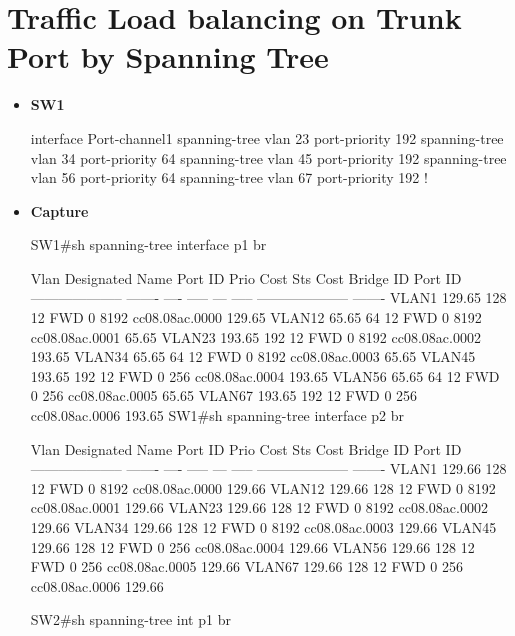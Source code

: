 \documentclass[10pt]{article}
\begin{document}
\section{Traffic Load balancing on Trunk Port by Spanning Tree}
\begin{itemize}
	\item {\bf SW1}
	\begin{verbatim*}
		interface Port-channel1
		 spanning-tree vlan 23 port-priority 192
		 spanning-tree vlan 34 port-priority 64
		 spanning-tree vlan 45 port-priority 192
		 spanning-tree vlan 56 port-priority 64
		 spanning-tree vlan 67 port-priority 192
		!
	\end{verbatim*}
	\item {\bf Capture}
	\begin{verbatim*}
		SW1#sh spanning-tree interface p1 br

		Vlan                                        Designated
		Name                 Port ID Prio Cost  Sts Cost  Bridge ID            Port ID
		-------------------- ------- ---- ----- --- ----- -------------------- -------
		VLAN1                129.65   128    12 FWD     0  8192 cc08.08ac.0000 129.65
		VLAN12                65.65    64    12 FWD     0  8192 cc08.08ac.0001  65.65
		VLAN23               193.65   192    12 FWD     0  8192 cc08.08ac.0002 193.65
		VLAN34                65.65    64    12 FWD     0  8192 cc08.08ac.0003  65.65
		VLAN45               193.65   192    12 FWD     0   256 cc08.08ac.0004 193.65
		VLAN56                65.65    64    12 FWD     0   256 cc08.08ac.0005  65.65
		VLAN67               193.65   192    12 FWD     0   256 cc08.08ac.0006 193.65
		SW1#sh spanning-tree interface p2 br

		Vlan                                        Designated
		Name                 Port ID Prio Cost  Sts Cost  Bridge ID            Port ID
		-------------------- ------- ---- ----- --- ----- -------------------- -------
		VLAN1                129.66   128    12 FWD     0  8192 cc08.08ac.0000 129.66
		VLAN12               129.66   128    12 FWD     0  8192 cc08.08ac.0001 129.66
		VLAN23               129.66   128    12 FWD     0  8192 cc08.08ac.0002 129.66
		VLAN34               129.66   128    12 FWD     0  8192 cc08.08ac.0003 129.66
		VLAN45               129.66   128    12 FWD     0   256 cc08.08ac.0004 129.66
		VLAN56               129.66   128    12 FWD     0   256 cc08.08ac.0005 129.66
		VLAN67               129.66   128    12 FWD     0   256 cc08.08ac.0006 129.66


		SW2#sh spanning-tree int p1 br


\end{verbatim*}
\end{itemize}
\end{document}
